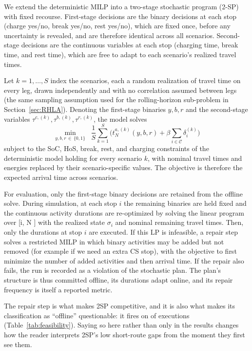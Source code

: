 We extend the deterministic MILP into a two-stage stochastic program (2-SP) with fixed recourse. First-stage decisions are the binary decisions at each stop (charge yes/no, break yes/no, rest yes/no), which are fixed once, before any uncertainty is revealed, and are therefore identical across all scenarios.
Second-stage decisions are the continuous variables at each stop (charging time, break time, and rest time), which are free to adapt to each scenario's realized travel times.

Let $k = 1, \ldots, S$ index the scenarios, each a random realization of travel time on every leg, drawn independently and with no correlation assumed between legs (the same sampling assumption used for the rolling-horizon sub-problem in Section~\ref{sec:RHLA}). Denoting the first-stage binaries $y, b, r$ and the second-stage variables $\tau^{c,(k)}, \tau^{b,(k)}, \tau^{r,(k)}$, the model solves
\[
  \min_{y,b,r \,\in\, \{0,1\}} \;\; \frac{1}{S}\sum_{k=1}^{S} \bigl(t^{a,(k)}_N(y,b,r) + \beta \sum_{i \in \mathcal C}\delta_i^{(k)}\bigr)
\]
subject to the SoC, HoS, break, rest, and charging constraints of the deterministic model holding for every scenario $k$, with nominal travel times and energies replaced by their scenario-specific values. The objective is therefore the expected arrival time across scenarios.

For evaluation, only the first-stage binary decisions are retained from the offline solve. During simulation, at each stop $i$ the remaining binaries are held fixed and the continuous activity durations are re-optimized by solving the linear program over [i, N ] with the realized state $\sigma_i$ and nominal remaining travel times. Then, only the durations at stop $i$ are executed. If this LP is infeasible, a repair step solves a restricted MILP in which binary activities may be added but not removed (for example if we need an extra CS stop), with the objective to first minimize the number of added activities and then arrival time. If the repair also fails, the run is recorded as a violation of the stochastic plan. The plan's structure is thus committed offline, its durations adapt online, and its repair frequency is itself a reported metric.

\begin{acmt}
The repair step is what makes 2SP competitive, and it is also what makes its
classification as ``offline'' questionable: it fires on  of
executions (Table~\ref{tab:feasibility}). Saying so here rather than only in the
results changes how the reader interprets 2SP's low short-route gaps from the
moment they first see them.
\end{acmt}

